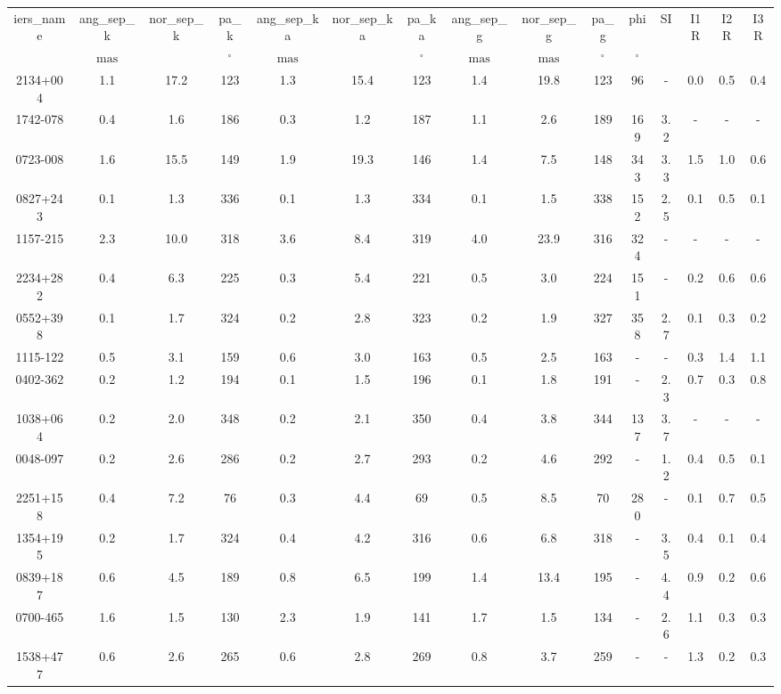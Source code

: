 \begin{table}
\begin{tabular}{ccccccccccccccc}
iers_name & ang_sep_k & nor_sep_k & pa_k & ang_sep_ka & nor_sep_ka & pa_ka & ang_sep_g & nor_sep_g & pa_g & phi & SI & I1R & I2R & I3R \\
 & $\mathrm{mas}$ &  & $\mathrm{{}^{\circ}}$ & $\mathrm{mas}$ &  & $\mathrm{{}^{\circ}}$ & $\mathrm{mas}$ & $\mathrm{mas}$ & $\mathrm{{}^{\circ}}$ & $\mathrm{{}^{\circ}}$ &  &  &  &  \\
2134+004 & 1.1 & 17.2 & 123 & 1.3 & 15.4 & 123 & 1.4 & 19.8 & 123 & 96 & - & 0.0 & 0.5 & 0.4 \\
1742-078 & 0.4 & 1.6 & 186 & 0.3 & 1.2 & 187 & 1.1 & 2.6 & 189 & 169 & 3.2 & - & - & - \\
0723-008 & 1.6 & 15.5 & 149 & 1.9 & 19.3 & 146 & 1.4 & 7.5 & 148 & 343 & 3.3 & 1.5 & 1.0 & 0.6 \\
0827+243 & 0.1 & 1.3 & 336 & 0.1 & 1.3 & 334 & 0.1 & 1.5 & 338 & 152 & 2.5 & 0.1 & 0.5 & 0.1 \\
1157-215 & 2.3 & 10.0 & 318 & 3.6 & 8.4 & 319 & 4.0 & 23.9 & 316 & 324 & - & - & - & - \\
2234+282 & 0.4 & 6.3 & 225 & 0.3 & 5.4 & 221 & 0.5 & 3.0 & 224 & 151 & - & 0.2 & 0.6 & 0.6 \\
0552+398 & 0.1 & 1.7 & 324 & 0.2 & 2.8 & 323 & 0.2 & 1.9 & 327 & 358 & 2.7 & 0.1 & 0.3 & 0.2 \\
1115-122 & 0.5 & 3.1 & 159 & 0.6 & 3.0 & 163 & 0.5 & 2.5 & 163 & - & - & 0.3 & 1.4 & 1.1 \\
0402-362 & 0.2 & 1.2 & 194 & 0.1 & 1.5 & 196 & 0.1 & 1.8 & 191 & - & 2.3 & 0.7 & 0.3 & 0.8 \\
1038+064 & 0.2 & 2.0 & 348 & 0.2 & 2.1 & 350 & 0.4 & 3.8 & 344 & 137 & 3.7 & - & - & - \\
0048-097 & 0.2 & 2.6 & 286 & 0.2 & 2.7 & 293 & 0.2 & 4.6 & 292 & - & 1.2 & 0.4 & 0.5 & 0.1 \\
2251+158 & 0.4 & 7.2 & 76 & 0.3 & 4.4 & 69 & 0.5 & 8.5 & 70 & 280 & - & 0.1 & 0.7 & 0.5 \\
1354+195 & 0.2 & 1.7 & 324 & 0.4 & 4.2 & 316 & 0.6 & 6.8 & 318 & - & 3.5 & 0.4 & 0.1 & 0.4 \\
0839+187 & 0.6 & 4.5 & 189 & 0.8 & 6.5 & 199 & 1.4 & 13.4 & 195 & - & 4.4 & 0.9 & 0.2 & 0.6 \\
0700-465 & 1.6 & 1.5 & 130 & 2.3 & 1.9 & 141 & 1.7 & 1.5 & 134 & - & 2.6 & 1.1 & 0.3 & 0.3 \\
1538+477 & 0.6 & 2.6 & 265 & 0.6 & 2.8 & 269 & 0.8 & 3.7 & 259 & - & - & 1.3 & 0.2 & 0.3 \\

\end{tabular}
\end{table}

